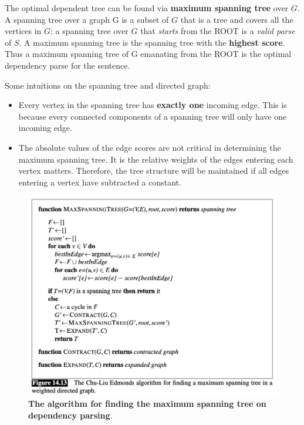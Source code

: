 \documentclass[11pt]{article}
\begin{document}
The optimal dependent tree can be found via \textbf{maximum spanning tree} over $G$. A spanning tree over a graph G is a subset of $G$ that is a tree and covers all the vertices in $G$; a spanning tree over $G$ that \emph{starts} from the ROOT is a \emph{valid parse} of $S$. A maximum spanning tree is the spanning tree with the \textbf{highest score}. Thus a maximum spanning tree of G emanating from the ROOT is the optimal dependency parse for the sentence.

Some intuitions on the spanning tree and directed graph:
\begin{itemize}
\item Every vertex in the spanning tree has \textbf{exactly one} incoming edge. This is because every connected components of a spanning tree will only have one incoming edge. 
\item The absolute values of the edge scores are not critical in determining the maximum spanning tree. It is the relative weights of the edges entering each vertex matters. Therefore, the tree structure will be maintained if all edges entering a vertex have subtracted a constant.    
\end{itemize}

\begin{figure}
\begin{minipage}[t]{1\linewidth}
  \centering
  \centerline{\includegraphics[scale = 0.4]{max_spanning_tree_depend_parse.png}}
\end{minipage}
\caption{\footnotesize{\textbf{The algorithm for finding the maximum spanning tree on dependency parsing}.}}
\label{fig: max_spanning_tree_depend_parse}
\end{figure}
\end{document}
